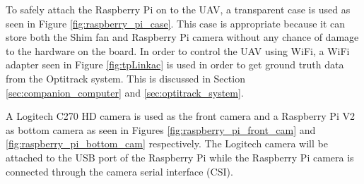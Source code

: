 \documentclass[../Head/report.tex]{subfiles}
\begin{document}
To safely attach the Raspberry Pi on to the UAV, a transparent case is used as seen in Figure \ref{fig:raspberry_pi_case}. This case is appropriate because it can store both the Shim fan and Raspberry Pi camera without any chance of damage to the hardware on the board. In order to control the UAV using WiFi, a WiFi adapter seen in Figure \ref{fig:tpLinkac} is used in order to get ground truth data from the Optitrack system. This is discussed in Section \ref{sec:companion_computer} and \ref{sec:optitrack_system}.

A Logitech C270 HD camera is used as the front camera and a Raspberry Pi V2 as bottom camera as seen in Figures \ref{fig:raspberry_pi_front_cam} and \ref{fig:raspberry_pi_bottom_cam} respectively. The Logitech camera will be attached to the USB port of the Raspberry Pi while the Raspberry Pi camera is connected through the camera serial interface (CSI). 
\end{document}
